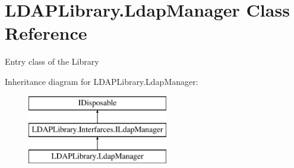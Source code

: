 \hypertarget{class_l_d_a_p_library_1_1_ldap_manager}{}\section{L\+D\+A\+P\+Library.\+Ldap\+Manager Class Reference}
\label{class_l_d_a_p_library_1_1_ldap_manager}


Entry class of the Library  


Inheritance diagram for L\+D\+A\+P\+Library.\+Ldap\+Manager\+:\begin{figure}[H]
\begin{center}
\leavevmode
\includegraphics[height=3.000000cm]{class_l_d_a_p_library_1_1_ldap_manager}
\end{center}
\end{figure}
